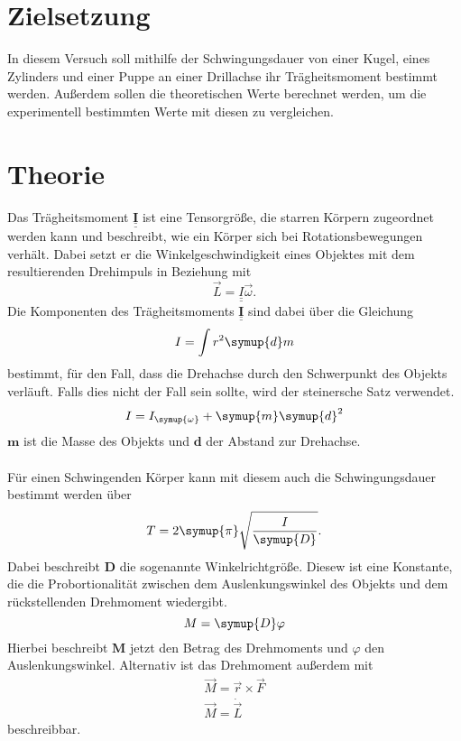 \section{Zielsetzung}
In diesem Versuch soll mithilfe der Schwingungsdauer von einer Kugel, eines Zylinders und einer Puppe 
an einer Drillachse ihr Trägheitsmoment bestimmt werden.
Außerdem sollen die theoretischen Werte berechnet werden, um die experimentell bestimmten Werte mit diesen zu vergleichen.\\

\section{Theorie}
\label{sec:Theorie}

Das Trägheitsmoment $\symbf{\underline{\underline{I}}}$ ist eine Tensorgröße, die starren Körpern zugeordnet werden kann und 
beschreibt, wie ein Körper sich bei Rotationsbewegungen verhält.
Dabei setzt er die Winkelgeschwindigkeit eines Objektes mit dem resultierenden Drehimpuls in Beziehung mit
\begin{equation}
    \vec{L}=\underline{\underline{I}} \vec{\omega} \text{.}
    \label{eqn:Dreh1}
\end{equation}
Die Komponenten des Trägheitsmoments $\symbf{\underline{\underline{I}}}$ sind dabei über die Gleichung
\begin{equation}
    I=\int r^2 \symup{d}m
    \label{eqn:Trägheit}
\end{equation}
bestimmt, für den Fall, dass die Drehachse durch den Schwerpunkt des Objekts verläuft. 
Falls dies nicht der Fall sein sollte, wird der steinersche Satz verwendet.
\begin{equation}
    I=I_{\symup{\omega}}+\symup{m} \symup{d}^2
    \label{eqn:Steiner}
\end{equation}   
$\symbf{m}$ ist die Masse des Objekts und $\symbf{d}$ der Abstand zur Drehachse. \\
\\
Für einen Schwingenden Körper kann mit diesem auch die Schwingungsdauer bestimmt werden über
\begin{equation}
    T=2 \symup{\pi} \sqrt{\frac{I}{\symup{D}}}\text{.}
    \label{eqn:Schwingungsdauer}
\end{equation}
Dabei beschreibt $\symbf{D}$ die sogenannte Winkelrichtgröße. Diesew ist eine Konstante, die die Probortionalität zwischen dem 
Auslenkungswinkel des Objekts und dem rückstellenden Drehmoment wiedergibt.
\begin{equation}
    M=\symup{D} \varphi %
    \label{eqn:Drehmom1}
\end{equation} 
Hierbei beschreibt $\symbf{M}$ jetzt den Betrag des Drehmoments und $\varphi$ den Auslenkungswinkel.
Alternativ ist das Drehmoment außerdem mit
\begin{gather}
    \vec{M}=\vec{r} \times \vec{F} \\ \vec{M}=\dot{\vec{L}}
    \label{eqn:Drehmom2}
\end{gather}
beschreibbar.

